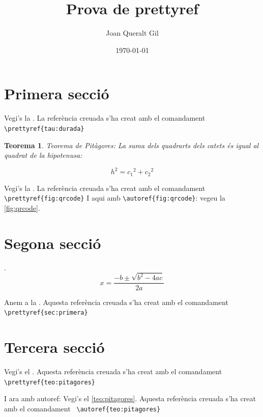 \documentclass[fontsize=11pt,%
               paper=a4,%
               captions=tableheading,%
               numbers=noenddot,%
               parskip=full,%
               ]{scrartcl}
\author{Joan Queralt Gil}
\title{Prova de prettyref}
\date{\today}
\newtheorem{meuteo}{Teorema}
\begin{document}
\maketitle

\tableofcontents

\section{Primera secció}\label{sec:primera}

Vegi's la . La referència creuada s'ha creat amb el comandament \verb+\prettyref{tau:durada}+

\lipsum[1-3]

\begin{meuteo}\label{teo:pitagores}
 Teorema de Pitàgores: La suma dels quadrarts dels catets és igual al quadrat de la hipotenusa:
 
 \[h^2 = c_1{^2} + c_2{^2} \]
\end{meuteo}

\lipsum[2-3]

Vegi's la . La referència creuada s'ha creat amb el comandament \verb+\prettyref{fig:qrcode}+ 
I aqui amb \verb+\autoref{fig:qrcode}+: vegeu la \autoref{fig:qrcode}.

\section{Segona secció}\label{sec:segona}
\lipsum[1-3].
\begin{equation}\label{eq:segongrau}
 x=\frac{-b\pm\sqrt{b^2-4ac}}{2a}
\end{equation}

Anem a la . Aquesta referència creuada s'ha creat amb el comandament \verb+\prettyref{sec:primera}+

\lipsum[2-3]

\section{Tercera secció}\label{sec:tercera}
\lipsum[1-3]

Vegi's el . Aquesta referència creuada s'ha creat amb el comandament \verb+\prettyref{teo:pitagores}+

I ara amb autoref: Vegi's el \autoref{teo:pitagores}. Aquesta referència creuada s'ha creat amb el comandament \verb+ \autoref{teo:pitagores}+

\lipsum[2-3]
\end{document}
